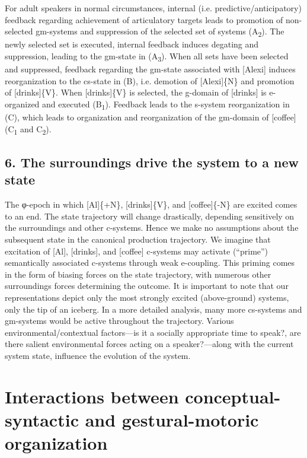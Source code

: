   For adult speakers in normal circumstances, internal (i.e. predictive/anticipatory) feedback regarding achievement of articulatory targets leads to promotion of non-selected gm-systems and suppression of the selected set of systems (A\textsubscript{2}). The newly selected set is executed, internal feedback induces degating and suppression, leading to the gm-state in (A\textsubscript{3}). When all sets have been selected and suppressed, feedback regarding the gm-state associated with [Alexi] induces reorganization to the cs-state in (B), i.e. demotion of [Alexi]\{N\} and promotion of [drinks]\{V\}. When [drinks]\{V\} is selected, the g-domain of [drinks] is e-organized and executed (B\textsubscript{1}). Feedback leads to the s-system reorganization in (C), which leads to organization and reorganization of the gm-domain of [coffee] (C\textsubscript{1} and C\textsubscript{2}).

\subsection{6. The surroundings drive the system to a new state}

The φ-epoch in which [Al]\{+N\}, [drinks]\{V\}, and [coffee]\{-N\} are excited comes to an end. The state trajectory will change drastically, depending sensitively on the surroundings and other c-systems. Hence we make no assumptions about the subsequent state in the canonical production trajectory. We imagine that excitation of [Al], [drinks], and [coffee] c-systems may activate (“prime”) semantically associated c-systems through weak e-coupling. This priming comes in the form of biasing forces on the state trajectory, with numerous other surroundings forces determining the outcome. It is important to note that our representations depict only the most strongly excited (above-ground) systems, only the tip of an iceberg. In a more detailed analysis, many more cs-systems and gm-systems would be active throughout the trajectory. Various environmental/contextual factors—is it a socially appropriate time to speak?, are there salient environmental forces acting on a speaker?—along with the current system state, influence the evolution of the system. 

\section{Interactions between conceptual-syntactic and gestural-motoric organization}

